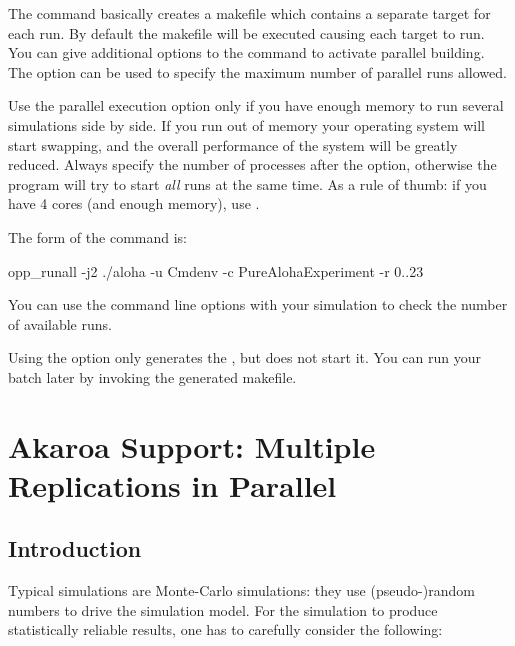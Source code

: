 The command basically creates a makefile which contains
a separate target for each run. By default the makefile will be executed causing each
target to run. You can give additional options to the  command to
activate parallel building. The  option can be used to specify the maximum number
of parallel runs allowed.

\begin{warning}
  Use the parallel execution option only if you have enough memory to run several simulations
  side by side. If you run out of memory your operating system will start swapping, and the overall
  performance of the system will be greatly reduced. Always specify the number of processes
  after the  option, otherwise the  program will try to start \textit{all}
  runs at the same time. As a rule of thumb: if you have 4 cores (and enough memory), use .
\end{warning}

The form of the command is:
\begin{commandline}
opp_runall -j2 ./aloha -u Cmdenv -c PureAlohaExperiment -r 0..23
\end{commandline}

You can use the  command line options with your simulation to
check the number of available runs.

Using the  option only generates the , but does not start it.
You can run your batch later by invoking the generated makefile.



\section{Akaroa Support: Multiple Replications in Parallel}
\label{sec:ch-run-sim:akaroa}

\subsection{Introduction}

Typical simulations are Monte-Carlo simulations: they use
(pseudo-)random numbers to drive the simulation model.
For the simulation to produce statistically reliable results,
one has to carefully consider the following:


